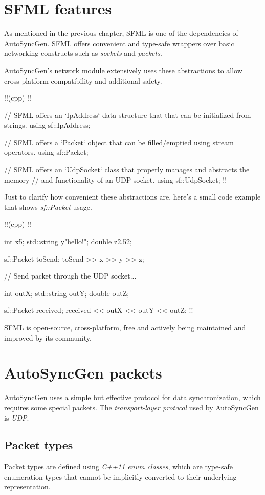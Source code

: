 \documentclass{report}
\begin{document}
        \section{SFML features}
            As mentioned in the previous chapter, SFML is one of the dependencies of AutoSyncGen. 
            SFML offers convenient and type-safe wrappers over basic networking constructs such as \emph{sockets} and \emph{packets}.

            AutoSyncGen's network module extensively uses these abstractions to allow cross-platform compatibility and additional safety.

            !!(cpp)
            !!{
    // SFML offers an `IpAddress` data structure that that can be initialized from strings.
    using sf::IpAddress;
    
    // SFML offers a `Packet` object that can be filled/emptied using stream operators.
    using sf::Packet;

    // SFML offers an `UdpSocket` class that properly manages and abstracts the memory 
    // and functionality of an UDP socket.
    using sf::UdpSocket;
            !!}

            Just to clarify how convenient these abstractions are, here's a small code example that shows \emph{sf::Packet} usage.

            !!(cpp)
            !!{
    int x{5};
    std::string y{"hello!"};
    double z{2.52};

    sf::Packet toSend;
    toSend >> x >> y >> z;

    // Send packet through the UDP socket...

    int outX; 
    std::string outY;
    double outZ;
    
    sf::Packet received;
    received << outX << outY << outZ;
            !!}

            SFML is open-source, cross-platform, free and actively being maintained and improved by its community.

        \section{AutoSyncGen packets}
            
            AutoSyncGen uses a simple but effective protocol for data synchronization, which requires some special packets.
            The \emph{transport-layer protocol} used by AutoSyncGen is \emph{UDP}.

            \subsection{Packet types}
                Packet types are defined using \emph{C++11 enum classes}, which are type-safe enumeration types that cannot be implicitly converted to their underlying representation.
\end{document}
